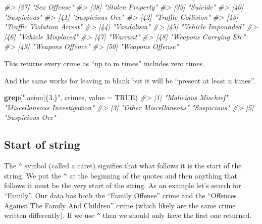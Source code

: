 \documentclass[
  12pt,
]{book}
\newenvironment{Shaded}{\begin{snugshade}}{\end{snugshade}}
\newcommand{\CommentTok}[1]{\textcolor[rgb]{0.56,0.35,0.01}{\textit{#1}}}
\newcommand{\DataTypeTok}[1]{\textcolor[rgb]{0.13,0.29,0.53}{#1}}
\newcommand{\KeywordTok}[1]{\textcolor[rgb]{0.13,0.29,0.53}{\textbf{#1}}}
\newcommand{\NormalTok}[1]{#1}
\newcommand{\OtherTok}[1]{\textcolor[rgb]{0.56,0.35,0.01}{#1}}
\newcommand{\StringTok}[1]{\textcolor[rgb]{0.31,0.60,0.02}{#1}}
\begin{document}
\begin{Shaded}
\begin{Highlighting}[]
\CommentTok{\#> [37] "Sex Offense"                               }
\CommentTok{\#> [38] "Stolen Property"                           }
\CommentTok{\#> [39] "Suicide"                                   }
\CommentTok{\#> [40] "Suspicious"                                }
\CommentTok{\#> [41] "Suspicious Occ"                            }
\CommentTok{\#> [42] "Traffic Collision"                         }
\CommentTok{\#> [43] "Traffic Violation Arrest"                  }
\CommentTok{\#> [44] "Vandalism"                                 }
\CommentTok{\#> [45] "Vehicle Impounded"                         }
\CommentTok{\#> [46] "Vehicle Misplaced"                         }
\CommentTok{\#> [47] "Warrant"                                   }
\CommentTok{\#> [48] "Weapons Carrying Etc"                      }
\CommentTok{\#> [49] "Weapons Offence"                           }
\CommentTok{\#> [50] "Weapons Offense"}
\end{Highlighting}
\end{Shaded}

This returns every crime as ``up to m times'' includes zero times.

And the same works for leaving m blank but it will be ``present at least n times''.

\begin{Shaded}
\begin{Highlighting}[]
\KeywordTok{grep}\NormalTok{(}\StringTok{"[aeiou]\{3,\}"}\NormalTok{, crimes, }\DataTypeTok{value =} \OtherTok{TRUE}\NormalTok{)}
\CommentTok{\#> [1] "Malicious Mischief"          "Miscellaneous Investigation"}
\CommentTok{\#> [3] "Other Miscellaneous"         "Suspicious"                 }
\CommentTok{\#> [5] "Suspicious Occ"}
\end{Highlighting}
\end{Shaded}

\hypertarget{start-of-string}{%
\subsection{Start of string}\label{start-of-string}}

The \texttt{\^{}} symbol (called a caret) signifies that what follows it is the start of the string. We put the \texttt{\^{}} at the beginning of the quotes and then anything that follows it must be the very start of the string. As an example let's search for ``Family''. Our data has both the ``Family Offense'' crime and the ``Offences Against The Family And Children'' crime (which likely are the same crime written differently). If we use \texttt{\^{}} then we should only have the first one returned.
\end{document}
